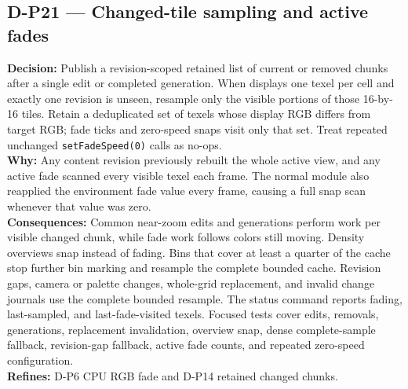 \subsection*{D-P21 --- Changed-tile sampling and active fades}
\begin{decisionbox}[title={D-P21 \quad 2026-08-09}]
\textbf{Decision:} Publish a revision-scoped retained list of current or
removed chunks after a single edit or completed generation. When
 displays one texel per cell and exactly one revision is
unseen, resample only the visible portions of those 16-by-16 tiles. Retain a
deduplicated set of texels whose display RGB differs from target RGB; fade
ticks and zero-speed snaps visit only that set. Treat repeated unchanged
\texttt{setFadeSpeed(0)} calls as no-ops.\\
\textbf{Why:} Any content revision previously rebuilt the whole active view,
and any active fade scanned every visible texel each frame. The normal module
also reapplied the environment fade value every frame, causing a full snap
scan whenever that value was zero.\\
\textbf{Consequences:} Common near-zoom edits and generations perform work per
visible changed chunk, while fade work follows colors still moving. Density
overviews snap instead of fading. Bins that cover at least a quarter of the
cache stop further bin marking and resample the complete bounded cache.
Revision gaps, camera or palette changes, whole-grid replacement, and
invalid change journals use the complete bounded resample.
The status command reports fading, last-sampled, and last-fade-visited texels.
Focused tests cover edits, removals, generations, replacement invalidation,
overview snap, dense complete-sample fallback, revision-gap fallback, active
fade counts, and repeated zero-speed
configuration.\\
\textbf{Refines:} D-P6 CPU RGB fade and D-P14 retained changed chunks.
\end{decisionbox}

